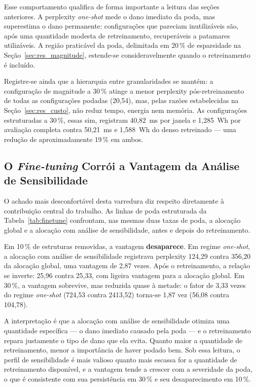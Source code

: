 Esse comportamento qualifica de forma importante a leitura das seções
anteriores. A perplexity \textit{one-shot} mede o dano imediato da poda, mas
superestima o dano permanente: configurações que pareciam inutilizáveis são,
após uma quantidade modesta de retreinamento, recuperáveis a patamares
utilizáveis. A região praticável da poda, delimitada em 20\,\% de esparsidade
na Seção~\ref{sec:res_magnitude}, estende-se consideravelmente quando o
retreinamento é incluído.

Registre-se ainda que a hierarquia entre granularidades se mantém: a
configuração de magnitude a 30\,\% atinge a menor perplexity pós-retreinamento
de todas as configurações podadas (20,54), mas, pelas razões estabelecidas na
Seção~\ref{sec:res_custo}, não reduz tempo, energia nem memória. As
configurações estruturadas a 30\,\%, essas sim, registram 40,82~ms por janela e
1,285~Wh por avaliação completa contra 50,21~ms e 1,588~Wh do denso retreinado --- uma
redução de aproximadamente 19\,\% em ambos.

\subsection{O \textit{Fine-tuning} Corrói a Vantagem da Análise de
Sensibilidade}\label{subsec:ft_corroi}

O achado mais desconfortável desta varredura diz respeito diretamente à
contribuição central do trabalho. As linhas de poda estruturada da
Tabela~\ref{tab:finetune} confrontam, nas mesmas duas taxas de poda, a alocação global e a
alocação com análise de sensibilidade, antes e depois do retreinamento.

Em 10\,\% de estruturas removidas, a vantagem \textbf{desaparece}. Em regime
\textit{one-shot}, a alocação com análise de sensibilidade registrava perplexity 124,29
contra 356,20 da alocação global, uma vantagem de 2,87 vezes. Após o retreinamento, a
relação se inverte: 25,96 contra 25,33, com ligeira vantagem para a alocação
global. Em 30\,\%, a vantagem sobrevive, mas reduzida quase à metade: o fator
de 3,33 vezes do regime \textit{one-shot} (724,53 contra 2413,52) torna-se
1,87 vez (56,08 contra 104,78).

A interpretação é que a alocação com análise de sensibilidade otimiza uma quantidade
específica --- o dano imediato causado pela poda --- e o retreinamento repara
justamente o tipo de dano que ela evita. Quanto maior a quantidade de
retreinamento, menor a importância de haver podado bem. Sob essa leitura, o
perfil de sensibilidade é mais valioso quanto mais escassa for a quantidade de
retreinamento disponível, e a vantagem tende a crescer com a severidade da
poda, o que é consistente com sua persistência em 30\,\% e seu
desaparecimento em 10\,\%.

